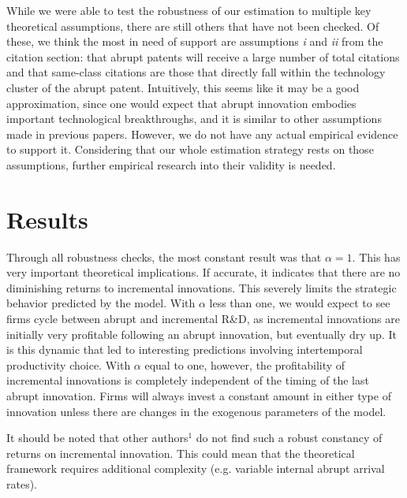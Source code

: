\documentclass[letterpaper,12pt]{article}
\theoremstyle{definition}
\begin{document}
While we were able to test the robustness of our estimation to multiple key theoretical assumptions, there are still others that have not been checked. Of these, we think the most in need of support are assumptions \textit{i} and \textit{ii} from the citation section: that abrupt patents will receive a large number of total citations and that same-class citations are those that directly fall within the technology cluster of the abrupt patent. Intuitively, this seems like it may be a good approximation, since one would expect that abrupt innovation embodies important technological breakthroughs, and it is similar to other assumptions made in previous papers. However, we do not have any actual empirical evidence to support it. Considering that our whole estimation strategy rests on those assumptions, further empirical research into their validity is needed.

\section{Results}\label{sec:Results}

Through all robustness checks, the most constant result was that $\alpha = 1$. This has very important theoretical implications. If accurate, it indicates that there are no diminishing returns to incremental innovations. This severely limits the strategic behavior predicted by the model. With $\alpha$ less than one, we would expect to see firms cycle between abrupt and incremental R\&D, as incremental innovations are initially very profitable following an abrupt innovation, but eventually dry up. It is this dynamic that led to interesting predictions involving intertemporal productivity choice. With $\alpha$ equal to one, however, the profitability of incremental innovations is completely independent of the timing of the last abrupt innovation. Firms will always invest a constant amount in either type of innovation unless there are changes in the exogenous parameters of the model.

It should be noted that other authors$^1$ do not find such a robust constancy of returns on incremental innovation. This could mean that the theoretical framework requires additional complexity (e.g. variable internal abrupt arrival rates).
\end{document}
